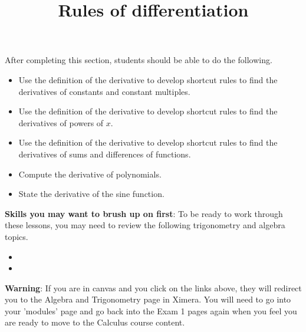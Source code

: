 \documentclass{ximera}
\title{Rules of differentiation}
\begin{document}
\begin{abstract}
\end{abstract}

\maketitle

\begin{sectionOutcomes}

After completing this section, students should be able to do the following.

\begin{itemize}
	\item Use the definition of the derivative to develop shortcut rules to find the derivatives of constants and constant multiples.
	\item Use the definition of the derivative to develop shortcut rules to find the derivatives of powers of $x$.
	\item Use the definition of the derivative to develop shortcut rules to find the derivatives of sums and differences of functions.
        \item Compute the derivative of polynomials.
	\item State the derivative of the sine function.
\end{itemize}

\end{sectionOutcomes}

\bigskip

\textbf{Skills you may want to brush up on first}: To be ready to work
through these lessons, you may need to review the following trigonometry and algebra topics.
\begin{itemize}
    \item {}
    \item {}
\end{itemize}

\bigskip

\textbf{Warning}: If you are in canvas and you click on the links above, they will redirect you
to the Algebra and Trigonometry page in Ximera. You will need to
go into your 'modules' page and go back into the Exam 1 pages again
when you feel you are ready to move to the Calculus course content.
\end{document}
